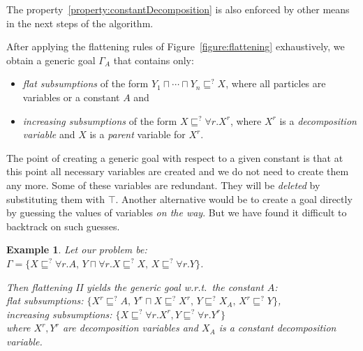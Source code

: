 \documentclass{article}
\newtheorem{example}{Example}
\newcommand{\wrt}{w.r.t.\ }
\begin{document}
The property~\ref{property:constantDecomposition} is also enforced by other means in the next steps of the algorithm.

After applying the flattening rules of Figure~\ref{figure:flattening} exhaustively, we obtain a generic goal
$\Gamma_A$ that contains only:
\begin{itemize}
\item \emph{flat subsumptions} of the form $Y_1 \sqcap \cdots \sqcap Y_n \sqsubseteq^? X$, where all particles are variables or a constant $A$ and 
\item \emph{increasing subsumptions} of the form $X \sqsubseteq^? \forall r.X^r$, where $X^r$ is a \emph{decomposition variable} and $X$ is a \emph{parent} variable for $X^r$.
\end{itemize}

%

The point of creating a generic goal with respect to a given constant is that at this point 
all necessary variables are created and we do not need to create them any more.
Some of these variables are redundant. They will be \emph{deleted} by substituting them with $\top$.
Another alternative would be to create a goal directly by guessing the values of variables \emph{on the way}. But we have found it difficult to backtrack on such guesses. 

\begin{example}\label{example:genericgoal}
	Let our problem be:\\
	$\Gamma = \{ X \sqsubseteq^? \forall r.A,\, Y \sqcap \forall r.X \sqsubseteq^? X, \, X \sqsubseteq^? \forall r.Y\}$.
	
	\noindent
	Then flattening II yields the generic goal \wrt the constant $A$:\\
flat subsumptions: $ \{ X^r \sqsubseteq^? A,\, Y^r \sqcap X \sqsubseteq^? X^r,\,  Y  \sqsubseteq^? X_A,\, X^r \sqsubseteq^? Y  \}$,\\
increasing subsumptions: $\{ X \sqsubseteq^? \forall r.X^r, Y \sqsubseteq^? \forall r.Y^r\}$\\
	where $X^r, Y^r$ are decomposition variables and $X_A$ is a constant decomposition variable.
	\end{example}
\end{document}
